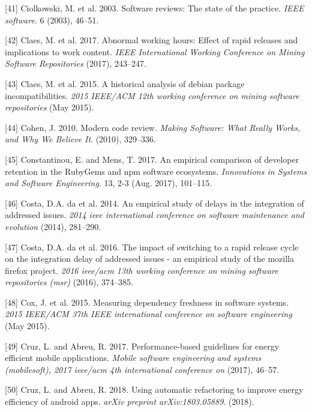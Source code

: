 \documentclass[]{book}
\begin{document}
\hypertarget{ref-ciolkowski2003software}{}
{[}41{]} Ciolkowski, M. et al. 2003. Software reviews: The state of the
practice. \emph{IEEE software}. 6 (2003), 46--51.

\hypertarget{ref-claes2017a}{}
{[}42{]} Claes, M. et al. 2017. Abnormal working hours: Effect of rapid
releases and implications to work content. \emph{IEEE International
Working Conference on Mining Software Repositories} (2017), 243--247.

\hypertarget{ref-Claes2015}{}
{[}43{]} Claes, M. et al. 2015. A historical analysis of debian package
incompatibilities. \emph{2015 IEEE/ACM 12th working conference on mining
software repositories} (May 2015).

\hypertarget{ref-cohen2010modern}{}
{[}44{]} Cohen, J. 2010. Modern code review. \emph{Making Software: What
Really Works, and Why We Believe It}. (2010), 329--336.

\hypertarget{ref-Constantinou2017}{}
{[}45{]} Constantinou, E. and Mens, T. 2017. An empirical comparison of
developer retention in the RubyGems and npm software ecosystems.
\emph{Innovations in Systems and Software Engineering}. 13, 2-3 (Aug.
2017), 101--115.

\hypertarget{ref-da2014a}{}
{[}46{]} Costa, D.A. da et al. 2014. An empirical study of delays in the
integration of addressed issues. \emph{2014 ieee international
conference on software maintenance and evolution} (2014), 281--290.

\hypertarget{ref-da2016a}{}
{[}47{]} Costa, D.A. da et al. 2016. The impact of switching to a rapid
release cycle on the integration delay of addressed issues - an
empirical study of the mozilla firefox project. \emph{2016 ieee/acm 13th
working conference on mining software repositories (msr)} (2016),
374--385.

\hypertarget{ref-Cox2015}{}
{[}48{]} Cox, J. et al. 2015. Measuring dependency freshness in software
systems. \emph{2015 IEEE/ACM 37th IEEE international conference on
software engineering} (May 2015).

\hypertarget{ref-CA2017}{}
{[}49{]} Cruz, L. and Abreu, R. 2017. Performance-based guidelines for
energy efficient mobile applications. \emph{Mobile software engineering
and systems (mobilesoft), 2017 ieee/acm 4th international conference on}
(2017), 46--57.

\hypertarget{ref-CA2018}{}
{[}50{]} Cruz, L. and Abreu, R. 2018. Using automatic refactoring to
improve energy efficiency of android apps. \emph{arXiv preprint
arXiv:1803.05889}. (2018).
\end{document}
